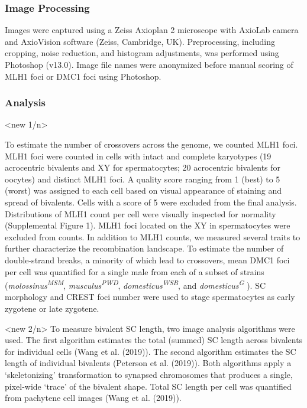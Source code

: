 \documentclass[
]{article}
\begin{document}
\hypertarget{image-processing}{%
\subsubsection{Image Processing}\label{image-processing}}

Images were captured using a Zeiss Axioplan 2 microscope with AxioLab
camera and AxioVision software (Zeiss, Cambridge, UK). Preprocessing,
including cropping, noise reduction, and histogram adjustments, was
performed using Photoshop (v13.0). Image file names were anonymized
before manual scoring of MLH1 foci or DMC1 foci using Photoshop.

\hypertarget{analysis}{%
\subsubsection{Analysis}\label{analysis}}

\textless new 1/n\textgreater{}

To estimate the number of crossovers across the genome, we counted MLH1
foci. MLH1 foci were counted in cells with intact and complete
karyotypes (19 acrocentric bivalents and XY for spermatocytes; 20
acrocentric bivalents for oocytes) and distinct MLH1 foci. A quality
score ranging from 1 (best) to 5 (worst) was assigned to each cell based
on visual appearance of staining and spread of bivalents. Cells with a
score of 5 were excluded from the final analysis. Distributions of MLH1
count per cell were visually inspected for normality (Supplemental
Figure 1). MLH1 foci located on the XY in spermatocytes were excluded
from counts. In addition to MLH1 counts, we measured several traits to
further characterize the recombination landscape. To estimate the number
of double-strand breaks, a minority of which lead to crossovers, mean
DMC1 foci per cell was quantified for a single male from each of a
subset of strains (\emph{molossinus\textsuperscript{MSM}},
\emph{musculus\textsuperscript{PWD}},
\emph{domesticus\textsuperscript{WSB}}, and
\emph{domesticus\textsuperscript{G}} ). SC morphology and CREST foci
number were used to stage spermatocytes as early zygotene or late
zygotene.

\textless new 2/n\textgreater{} To measure bivalent SC length, two image
analysis algorithms were used. The first algorithm estimates the total
(summed) SC length across bivalents for individual cells (Wang et al.
(2019)). The second algorithm estimates the SC length of individual
bivalents (Peterson et al. (2019)). Both algorithms apply a
`skeletonizing' transformation to synapsed chromosomes that produces a
single, pixel-wide `trace' of the bivalent shape. Total SC length per
cell was quantified from pachytene cell images (Wang et al. (2019)).
\end{document}
